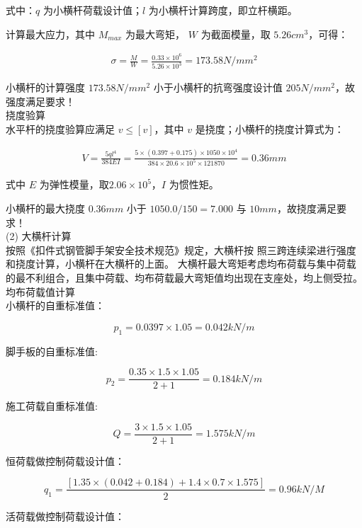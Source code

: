 式中：$q$ 为小横杆荷载设计值；$l$ 为小横杆计算跨度，即立杆横距。

计算最大应力，其中 $M_{max}$ 为最大弯矩， $W$ 为截面模量，取 $5.26 cm^3$，可得：

\begin{align}
    \label{fx:load}
    \sigma =\frac{M}{W}=\frac{0.33\times 10^6}{5.26\times10^3}=173.58N/mm^2
\end{align}

小横杆的计算强度 $173.58N/mm^2$ 小于小横杆的抗弯强度设计值 $205N/mm^2$，故强度满足要求！\\

 挠度验算\\

水平杆的挠度验算应满足 $v\leq [v] $，其中 $v$ 是挠度；小横杆的挠度计算式为：

\begin{align}
    V=\frac{5ql^4}{384EI}=\frac{5\times (0.397+0.175)\times 1050\times 10^4}{384\times 20.6\times 10^5\times 121870}=0.36 mm
\end{align}

式中 $E$ 为弹性模量，取$2.06\times 10^5$，$I$ 为惯性矩。

小横杆的最大挠度 $0.36mm$ 小于 $1050.0/150=7.000$ 与 $10mm$，故挠度满足要求！ \\

(2) 大横杆计算\\

按照《扣件式钢管脚手架安全技术规范》规定，大横杆按
照三跨连续梁进行强度和挠度计算，小横杆在大横杆的上面。
大横杆最大弯矩考虑均布荷载与集中荷载的最不利组合，且集中荷载、均布荷载最大弯矩值均出现在支座处，均上侧受拉。\\

 均布荷载值计算\\

小横杆的自重标准值：

$$p_1=0.0397 \times 1.05=0.042 kN/m$$

脚手板的自重标准值:

$$p_2=\frac{0.35 \times 1.5\times 1.05}{2+1}=0.184 kN/m$$

施工荷载自重标准值:

$$Q=\frac{3 \times 1.5\times 1.05}{2+1}=1.575 kN/m$$

恒荷载做控制荷载设计值：

$$q_1=\frac{[1.35\times(0.042+0.184)+1.4\times 0.7\times 1.575]}{2}=0.96 kN/M$$

活荷载做控制荷载设计值：


